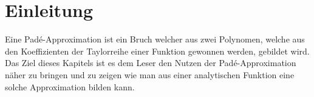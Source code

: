 %
%
%
\section{Einleitung\label{pade:section:einleitung}}
Eine Padé-Approximation ist ein Bruch welcher aus zwei Polynomen, welche aus den Koeffizienten der Taylorreihe einer Funktion gewonnen werden, gebildet wird. 
Das Ziel dieses Kapitels ist es dem Leser den Nutzen der Padé-Approximation näher zu bringen und zu zeigen wie man aus einer analytischen Funktion eine solche Approximation bilden kann. 


